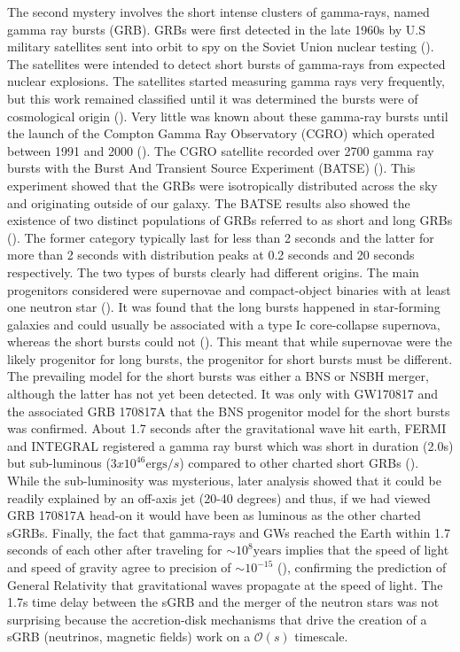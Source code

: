 The second mystery involves the short intense clusters of gamma-rays, named gamma ray bursts (GRB).  GRBs were first detected in the late 1960s by U.S military satellites sent into orbit to spy on the Soviet Union nuclear testing (\citet*{klebesadel1973observations}). The satellites were intended to detect short bursts of gamma-rays from expected nuclear explosions. The satellites started measuring gamma rays very frequently, but this work remained classified until it was determined the bursts were of cosmological origin (\citet*{klebesadel1973observations}). Very little was known about these gamma-ray bursts until the launch of the Compton Gamma Ray Observatory (CGRO) which operated between 1991 and 2000 (\citet*{fishman1995gamma}). The CGRO satellite recorded over 2700 gamma ray bursts
with the Burst And Transient Source Experiment (BATSE) (\citet*{fishman1989proc}).  This experiment showed that the GRBs were isotropically distributed across the sky and originating outside of our galaxy. The BATSE results also showed the existence of two distinct populations of GRBs referred to as short and long GRBs (\citet*{kouveliotou1993identification}). The former category typically last for less than 2 seconds and the latter for more than 2 seconds with distribution peaks at 0.2 seconds and 20 seconds respectively. The two types of bursts clearly had different origins. The main progenitors considered were supernovae and compact-object binaries with at least one neutron star (\citet*{levan2016gamma}). It was found that the long bursts happened in star-forming galaxies and could usually be associated with a type Ic core-collapse supernova, whereas the short bursts could not (\citet*{hjorth2013supernova}). This meant that while supernovae were the likely progenitor for long bursts, the progenitor for short bursts must be different. The prevailing model for the short bursts was either a BNS or NSBH merger, although the latter has not yet been detected. It was only with GW170817 and the associated GRB 170817A that the BNS progenitor model for the short bursts was confirmed. About 1.7 seconds after the gravitational wave hit earth, FERMI and INTEGRAL registered a gamma ray burst which was short in duration (2.0s) but sub-luminous ($3x10^{46} \text{ergs}/s$) compared to other charted short GRBs (\citet*{monitor:2017mdv,gbm:2017lvd}). While the sub-luminosity was mysterious, later analysis showed that it could be readily explained by an off-axis jet (20-40 degrees) and thus, if we had viewed GRB 170817A head-on it would have been as luminous as the other charted sGRBs. Finally, the fact that gamma-rays and GWs reached the Earth within 1.7 seconds of each other after traveling for $\sim 10^8 \text{years}$ implies that the speed of light and speed of gravity agree to precision of $\sim 10^{-15}$ (\citet*{monitor:2017mdv}), confirming the prediction of General Relativity that gravitational waves propagate at the speed of light. The 1.7s time delay between the sGRB and the merger of the neutron stars was not surprising because the accretion-disk mechanisms that drive the creation of a sGRB (neutrinos, magnetic fields) work on a $\mathcal{O}(s)$ timescale.

